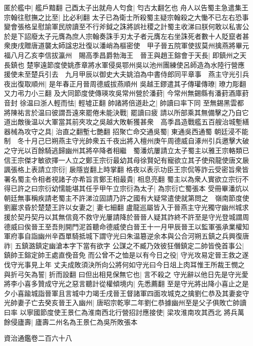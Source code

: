 匿於艦中|{
	艦戶黯翻}
己酉太子出就舟人匄食|{
	匄古太翻乞也}
舟人以告蜀主急遣集王宗翰往慰撫之比至|{
	比必利翻}
太子已為衛士所殺蜀主疑宗翰殺之大慟不已左右恐事變會張格呈慰諭軍民牓讀至不行斧鉞之誅將誤社稷之計蜀主收涕曰朕何敢以私害公於是下詔廢太子元膺為庶人宗翰奏誅手刃太子者元膺左右坐誅死者數十人貶竄者甚衆庚戌贈唐道襲太師諡忠壯復以潘峭為樞密使　甲子晉五院軍使拔莫州擒燕將畢元福八月乙亥李信拔瀛州　賜高季昌爵勃海王　晉王與趙王鎔會于天長|{
	即鎮州之天長鎮也}
楚寧遠節度使姚彥章將水軍侵吳鄂州吳以池州團練使呂師造為水陸行營應援使未至楚兵引去　九月甲辰以御史大夫姚洎為中書侍郎同平章事　燕主守光引兵夜出復取順州|{
	是年春正月晉周德威拔燕順州}
吳越王鏐遣其子傳瓘傳璙|{
	璙力彫翻又力弔力小三翻}
及大同節度使傳瑛攻吳常州營於潘葑|{
	今常州無錫縣有潘葑酒庫葑音封}
徐温曰浙人輕而怯|{
	輕墟正翻}
帥諸將倍道赴之|{
	帥讀曰率下同}
至無錫黑雲都將陳祐言於温曰彼謂吾遠來罷倦未能決戰|{
	罷讀曰疲}
請以所部乘其無備擊之乃自它道出敵後温以大軍當其前夾攻之吳越大敗斬獲甚衆　高季昌造戰艦五百艘治城塹繕器械為攻守之具|{
	治直之翻塹七艷翻}
招聚亡命交通吳蜀|{
	東通吳西通蜀}
朝廷浸不能制　冬十月己巳朔燕主守光帥衆五千夜出將入檀州庚午周德威自涿州引兵邀擊大破之守光以百餘騎逃歸幽州其將卒降者相繼　蜀潘炕屢請立太子蜀主以雅王宗輅類已信王宗傑才敏欲擇一人立之鄭王宗衍最幼其母徐賢妃有寵欲立其子使飛龍使唐文扆諷張格上表請立宗衍|{
	扆隱豈翻上時掌翻}
格夜以表示功臣王宗侃等詐云受密旨衆皆署名蜀主令相者視諸子亦希旨言鄭王相最貴|{
	相息亮翻}
蜀主以為衆人實欲立宗衍不得已許之曰宗衍幼懦能堪其任乎甲午立宗衍為太子|{
	為宗衍亡蜀張本}
受冊畢潘炕以朝廷無事稱疾請老蜀主不許涕泣固請乃許之國有大疑常遣使就第問之　嶺南節度使劉巖求昏於楚楚王許以女妻之|{
	妻七細翻}
盧龍巡屬皆入于晉燕主守光獨守幽州城求援於契丹契丹以其無信竟不救守光屢請降於晉晉人疑其詐終不許至是守光登城謂周德威曰俟晉王至吾則開門泥首聽命德威使白晉王十一月甲辰晉王以監軍張承業權知軍府事自詣幽州辛酉單騎抵城下謂守光曰朱温簒逆余本與公合河朔五鎮之兵興復唐祚|{
	五鎮潞鎮定幽滄本字下當有欲字}
公謀之不臧乃效彼狂僭鎮定二帥皆俛首事公|{
	鎮帥王鎔定帥王處直俛音免}
而公曾不之恤是以有今日之役|{
	守光攻易定晉王救之遂伐守光事見上年}
丈夫成敗須決所向公將何如守光曰今日俎上肉耳惟王所裁王憫之與折弓矢為誓|{
	折而設翻}
曰但出相見保無它也|{
	言不殺之}
守光辭以他日先是守光愛將李小喜多贊成守光之惡言聽計從權傾境内|{
	先悉薦翻}
至是守光將出降小喜止之是夕小喜踰城詣晉軍且言城中力竭壬戌晉王督諸軍四面攻城克之擒劉仁恭及其妻妾守光帥妻子亡去癸亥晉王入幽州|{
	唐昭宗乾寧二年劉仁恭據幽州至是父子俱敗亡帥讀曰率}
以寧國節度使王景仁為淮南西北行營招討應接使|{
	梁攻淮南攻其西北}
將兵萬餘侵廬壽|{
	廬壽二州名為王景仁為吳所敗張本}


資治通鑑卷二百六十八

